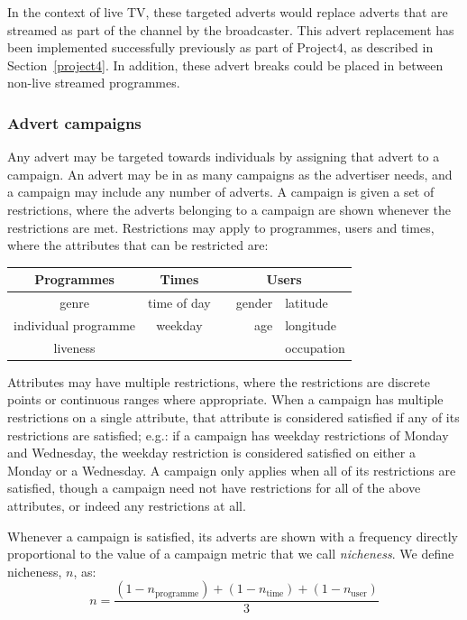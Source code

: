 In the context of live TV, these targeted adverts would replace adverts that are streamed as part of the channel by the broadcaster. This advert replacement has been implemented successfully previously as part of Project4, as described in Section~\ref{project4}. In addition, these advert breaks could be placed in between non-live streamed programmes.

\subsubsection{Advert campaigns}

Any advert may be targeted towards individuals by assigning that advert to a campaign. An advert may be in as many campaigns as the advertiser needs, and a campaign may include any number of adverts. A campaign is given a set of restrictions, where the adverts belonging to a campaign are shown whenever the restrictions are met. Restrictions may apply to programmes, users and times, where the attributes that can be restricted are:

\begin{center}
	\begin{tabular}{c c r l}
		\toprule
		\textbf{Programmes} & \textbf{Times} & \multicolumn{2}{c}{\textbf{Users}} \\
		\midrule
		genre & time of day & ~~gender & latitude \\ %
		individual programme & weekday & age & longitude \\
		liveness & & &  occupation \\
		\bottomrule
	\end{tabular}
\end{center}

Attributes may have multiple restrictions, where the restrictions are discrete points or continuous ranges where appropriate. When a campaign has multiple restrictions on a single attribute, that attribute is considered satisfied if any of its restrictions are satisfied; e.g.: if a campaign has weekday restrictions of Monday and Wednesday, the weekday restriction is considered satisfied on either a Monday or a Wednesday. A campaign only applies when all of its restrictions are satisfied, though a campaign need not have restrictions for all of the above attributes, or indeed any restrictions at all.

Whenever a campaign is satisfied, its adverts are shown with a frequency directly proportional to the value of a campaign metric that we call \textit{nicheness}. We define nicheness, $n$, as:
$$
	n = \frac{(1-n_\text{programme}) + (1-n_\text{time}) + (1-n_\text{user})}{3}
$$

